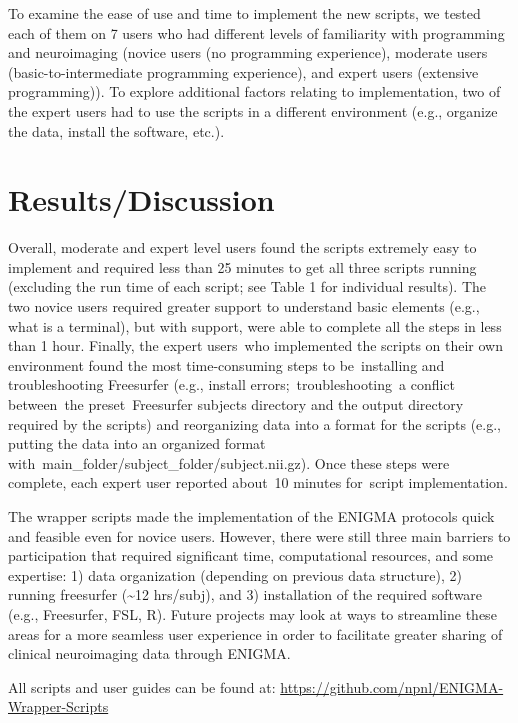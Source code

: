 \documentclass[twocolumn]{bmcart}%
\begin{document}
To examine the ease of use and time to implement the new scripts, we
tested each of them on 7 users who had different levels of familiarity
with programming and neuroimaging (novice users (no programming
experience), moderate users (basic-to-intermediate programming
experience), and expert users (extensive programming)). To explore
additional factors relating to implementation, two of the expert users
had to use the scripts in a different environment (e.g., organize the
data, install the software, etc.).

\section{Results/Discussion}\label{resultsdiscussion}

Overall, moderate and expert level users found the scripts extremely
easy to implement and required less than 25 minutes to get all three
scripts running (excluding the run time of each script; see Table 1 for
individual results). The two novice users required greater support to
understand basic elements (e.g., what is a terminal), but with support,
were able to complete all the steps in less than 1 hour. Finally, the expert users who implemented the scripts on their own environment found the most time-consuming steps to be installing and troubleshooting Freesurfer (e.g., install errors; troubleshooting a conflict between the preset Freesurfer subjects directory and the output directory required by the scripts) and reorganizing data into a format for the scripts (e.g., putting the data into an organized format with main_folder/subject_folder/subject.nii.gz). Once these steps were complete, each expert user reported about 10 minutes for script implementation.


The wrapper scripts made the implementation of the ENIGMA protocols
quick and feasible even for novice users. However, there were still
three main barriers to participation that required significant time,
computational resources, and some expertise: 1) data organization
(depending on previous data structure), 2) running freesurfer
(\textasciitilde{}12 hrs/subj), and 3) installation of the required
software (e.g., Freesurfer, FSL, R). Future projects may look at ways to
streamline these areas for a more seamless user experience in order to
facilitate greater sharing of clinical neuroimaging data through ENIGMA.

All scripts and user guides can be found at:
\url{https://github.com/npnl/ENIGMA-Wrapper-Scripts}
\end{document}
